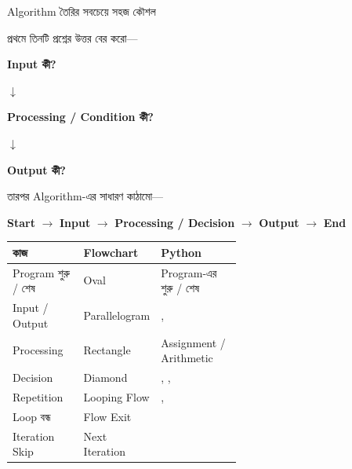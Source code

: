 \begin{revisionbox}{Algorithm তৈরির সবচেয়ে সহজ কৌশল}

প্রথমে তিনটি প্রশ্নের উত্তর বের করো—

\begin{center}

\textbf{Input কী?}

\(\downarrow\)

\textbf{Processing / Condition কী?}

\(\downarrow\)

\textbf{Output কী?}

\end{center}

তারপর Algorithm-এর সাধারণ কাঠামো—

\begin{center}

\textbf{Start}
\(\rightarrow\)
\textbf{Input}
\(\rightarrow\)
\textbf{Processing / Decision}
\(\rightarrow\)
\textbf{Output}
\(\rightarrow\)
\textbf{End}

\end{center}

\end{revisionbox}

\begin{tabularx}{\linewidth}{
|L{0.31\linewidth}
|L{0.27\linewidth}
|Y|
}
\hline

\textbf{\color{darkTeal}কাজ}
&
\textbf{\color{darkTeal}Flowchart}
&
\textbf{\color{darkTeal}Python}
\\
\hline

Program শুরু / শেষ
&
Oval
&
Program-এর শুরু / শেষ
\\
\hline

Input / Output
&
Parallelogram
&
, 
\\
\hline

Processing
&
Rectangle
&
Assignment / Arithmetic
\\
\hline

Decision
&
Diamond
&
, , 
\\
\hline

Repetition
&
Looping Flow
&
, 
\\
\hline

Loop বন্ধ
&
Flow Exit
&
\\
\hline

Iteration Skip
&
Next Iteration
&
\\
\hline

\end{tabularx}

